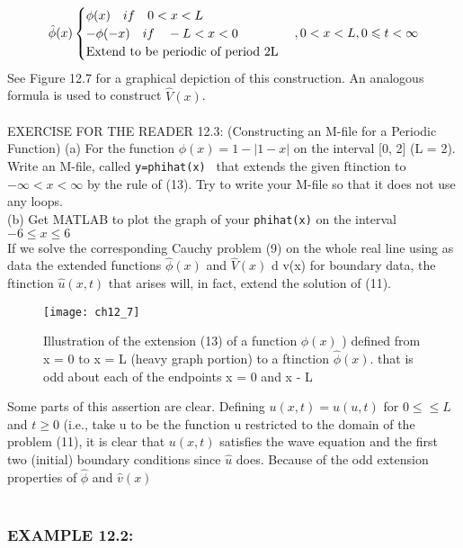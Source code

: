\documentclass[../main.tex]{subfiles}
\begin{document}
\begin{equation}
\hat{\phi}(x)
	\begin{cases} 
\phi (x)   ~~~ if~~~ 0< x< L\\
-\phi (-x) ~~~ if ~~~ -L < x <0\\
$Extend to be periodic of period 2L$\\
\end{cases}		
,0 < x < L, 0\leqslant t  < \infty	
\end{equation}
See Figure 12.7 for a graphical depiction of this construction. An analogous
formula is used to construct $\hat{V}(x)$.\\
\\
EXERCISE FOR THE READER 12.3: (Constructing an M-file for a Periodic
Function) (a) For the function $\phi(x) = 1-|1-x|$ on the interval [0, 2] (L = 2).
Write an M-file, called \texttt{y=phihat(x) } that extends the given ftinction to $-\infty < x<\infty$  by the rule of (13). Try to write your M-file so that it does not use
any loops.
\\
(b) Get MATLAB to plot the graph of your \texttt{phihat(x)} on the interval  $-6\leqslant x \leqslant 6$\\

If we solve the corresponding Cauchy problem (9) on the whole real line using as
data the extended functions $\hat{\phi}(x)$ and $\hat{V}(x)$ d v(x) for boundary data, the ftinction $\hat{u}(x,t)$ that arises will, in fact, extend the solution of (11). 


\begin{figure}[H]
	\centering
	\texttt{[image: ch12\_7]}
	\caption{\textsf{  Illustration of the extension (13) of a function $\phi(x)$ ) defined from x = 0 to x
= L (heavy graph portion) to a ftinction $\hat{\phi}(x)$. that is odd about each of the endpoints x = 0
and x - L }}
	\label{pfig:ch12_7}
\end{figure}
Some parts of this assertion are clear. Defining $u(x,t) = \hat{u} (u,t)$ for $ 0\leqslant \leqslant L$ and $ t\geq 0$  (i.e., take u to be the function u restricted to the domain of the
problem (11), it is clear that $u(x,t)$ satisfies the wave equation and the first two
(initial) boundary conditions since $\hat{u}$ does. Because of the odd extension 
properties of $\hat{\phi}$ and $ \hat{v} (x)$ 
\\
\\
\subsubsection{EXAMPLE 12.2:}
\end{document}
